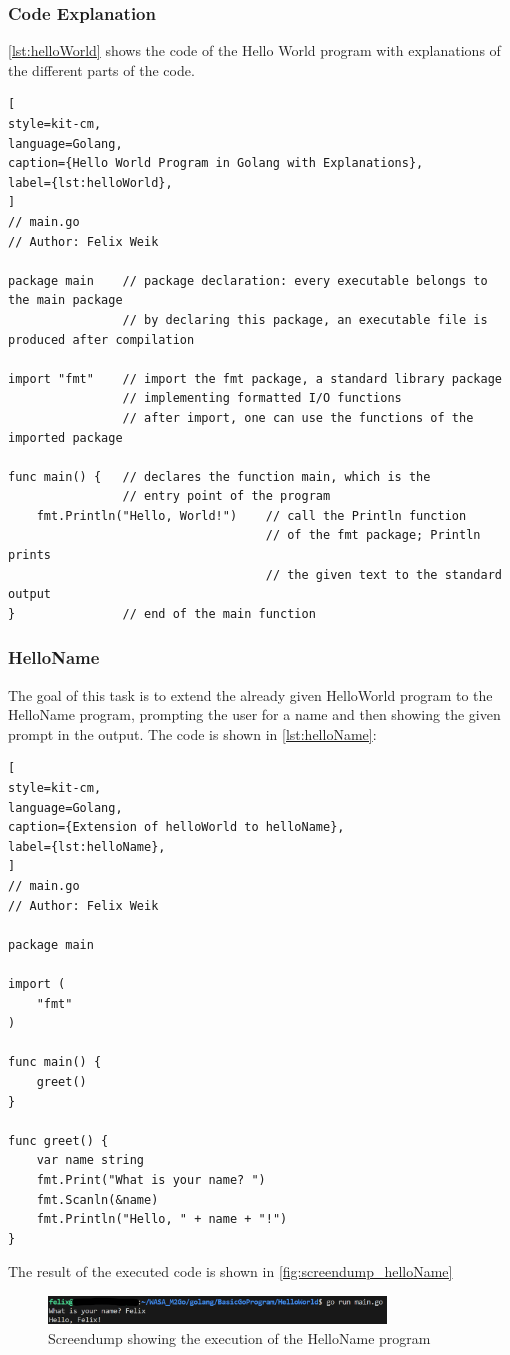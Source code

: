 \subsubsection*{Code Explanation}
\autoref{lst:helloWorld} shows the code of the Hello World program with explanations of the different parts of the code.
\begin{lstlisting}[
style=kit-cm,
language=Golang,
caption={Hello World Program in Golang with Explanations},
label={lst:helloWorld},
]
// main.go 
// Author: Felix Weik

package main    // package declaration: every executable belongs to the main package
                // by declaring this package, an executable file is produced after compilation

import "fmt"    // import the fmt package, a standard library package 
                // implementing formatted I/O functions
                // after import, one can use the functions of the imported package

func main() {   // declares the function main, which is the 
                // entry point of the program
    fmt.Println("Hello, World!")    // call the Println function 
                                    // of the fmt package; Println prints 
                                    // the given text to the standard output
}               // end of the main function

\end{lstlisting}

\subsubsection*{HelloName}
The goal of this task is to extend the already given HelloWorld program to the HelloName program, prompting the user for a name and then showing the given prompt in the output.
The code is shown in \autoref{lst:helloName}:
\begin{lstlisting}[
style=kit-cm,
language=Golang,
caption={Extension of helloWorld to helloName},
label={lst:helloName},
]
// main.go
// Author: Felix Weik

package main

import (
    "fmt"
)

func main() {
    greet()
}

func greet() {
    var name string
    fmt.Print("What is your name? ")
    fmt.Scanln(&name)
    fmt.Println("Hello, " + name + "!")
} 
\end{lstlisting}

The result of the executed code is shown in \autoref{fig:screendump_helloName}

\begin{figure}[H]
    \centering
    \includegraphics[width=0.8\textwidth]{figures/goLang/helloWorld/golang_helloWorld_helloName.png}
    \caption{Screendump showing the execution of the HelloName program}
    \label{fig:screendump_helloName}
\end{figure}